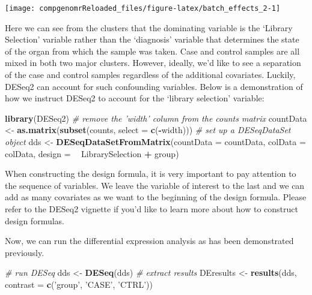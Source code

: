 \documentclass[12pt,]{krantz}
\newenvironment{Shaded}{\begin{snugshade}}{\end{snugshade}}
\newcommand{\CommentTok}[1]{\textcolor[rgb]{0.56,0.35,0.01}{\textit{#1}}}
\newcommand{\DataTypeTok}[1]{\textcolor[rgb]{0.13,0.29,0.53}{#1}}
\newcommand{\KeywordTok}[1]{\textcolor[rgb]{0.13,0.29,0.53}{\textbf{#1}}}
\newcommand{\NormalTok}[1]{#1}
\newcommand{\OperatorTok}[1]{\textcolor[rgb]{0.81,0.36,0.00}{\textbf{#1}}}
\newcommand{\StringTok}[1]{\textcolor[rgb]{0.31,0.60,0.02}{#1}}
\begin{document}
\begin{center}\texttt{[image: compgenomrReloaded\_files/figure-latex/batch\_effects\_2-1]} \end{center}

Here we can see from the clusters that the dominating variable is the `Library Selection' variable rather than the `diagnosis' variable that determines the state of the organ from which the sample was taken. Case and control samples are all mixed in both two major clusters. However, ideally, we'd like to see a separation of the case and control samples regardless of the additional covariates. Luckily, DESeq2 can account for such confounding variables. Below is a demonstration of how we instruct DESeq2 to account for the `library selection' variable:

\begin{Shaded}
\begin{Highlighting}[]
\KeywordTok{library}\NormalTok{(DESeq2)}
\CommentTok{# remove the 'width' column from the counts matrix}
\NormalTok{countData <-}\StringTok{ }\KeywordTok{as.matrix}\NormalTok{(}\KeywordTok{subset}\NormalTok{(counts, }\DataTypeTok{select =} \KeywordTok{c}\NormalTok{(}\OperatorTok{-}\NormalTok{width)))}
\CommentTok{# set up a DESeqDataSet object}
\NormalTok{dds <-}\StringTok{ }\KeywordTok{DESeqDataSetFromMatrix}\NormalTok{(}\DataTypeTok{countData =}\NormalTok{ countData, }
                              \DataTypeTok{colData =}\NormalTok{ colData, }
                              \DataTypeTok{design =} \OperatorTok{~}\StringTok{ }\NormalTok{LibrarySelection }\OperatorTok{+}\StringTok{ }\NormalTok{group)}
\end{Highlighting}
\end{Shaded}

When constructing the design formula, it is very important to pay attention to the sequence of variables. We leave the variable of interest to the last and we can add as many covariates as we want to the beginning of the design formula. Please refer to the DESeq2 vignette if you'd like to learn more about how to construct design formulas.

Now, we can run the differential expression analysis as has been demonstrated previously.

\begin{Shaded}
\begin{Highlighting}[]
\CommentTok{# run DESeq}
\NormalTok{dds <-}\StringTok{ }\KeywordTok{DESeq}\NormalTok{(dds)}
\CommentTok{# extract results}
\NormalTok{DEresults <-}\StringTok{ }\KeywordTok{results}\NormalTok{(dds, }\DataTypeTok{contrast =} \KeywordTok{c}\NormalTok{(}\StringTok{'group'}\NormalTok{, }\StringTok{'CASE'}\NormalTok{, }\StringTok{'CTRL'}\NormalTok{))}
\end{Highlighting}
\end{Shaded}
\end{document}
